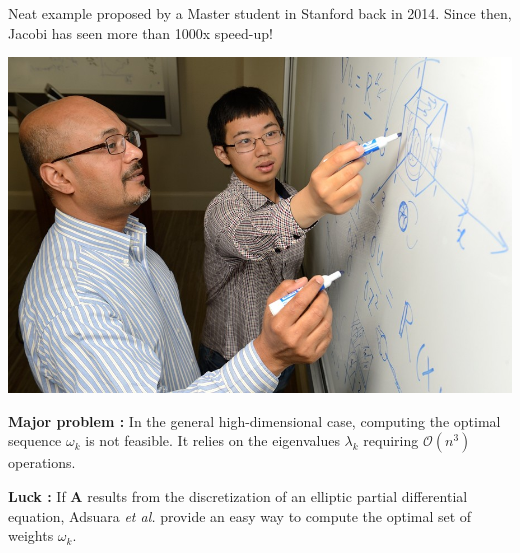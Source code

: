 \documentclass[aspectratio=169]{beamer}
\begin{document}
\begin{frame}
  \begin{minipage}{.48\textwidth}
    Neat example proposed by a Master student in Stanford back in 2014.
    Since then, Jacobi has seen more than 1000x speed-up!
    \vspace{-1cm}
  \end{minipage}%
  \hfill
  \begin{minipage}{.48\textwidth}
    \includegraphics[width=\textwidth]{yang_mittal}
  \end{minipage}
\end{frame}


{
}

\begin{frame}
  \alert{\textbf{Major problem :}} In the general high-dimensional case, computing the optimal sequence $\omega_k$ is not feasible.
  It relies on the eigenvalues $\lambda_k$ requiring $\mathcal{O}(n^3)$ operations.
  
  \vspace{-1.5cm}
\end{frame}

\begin{frame}
  \alert{\textbf{Luck :}} If $\bm{A}$ results from the discretization of an elliptic partial differential equation, Adsuara \emph{et al.} provide an easy way to compute the optimal set of weights $\omega_k$.
  
  \vspace{-1.5cm}
\end{frame}
\end{document}
